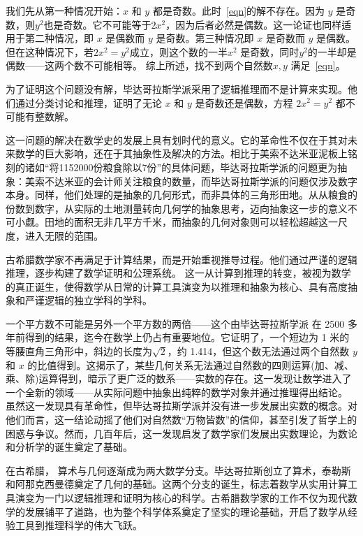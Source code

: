 我们先从第一种情况开始：$x$ 和 $y$ 都是奇数。此时~\eqref{eqn}的解不存在。因为 $y$ 是奇数，则$y^2$也是奇数。它不可能等于$2x^2$，因为后者必然是偶数。这一论证也同样适用于第二种情况，即 $x$ 是偶数而 $y$ 是奇数。第三种情况即 $x$ 是奇数而 $y$ 是偶数。但在这种情况下，若$2x^2=y^2$成立，则这个数的一半$x^2$ 是奇数，同时$y^2$的一半却是偶数——这两个数不可能相等。
综上所述，找不到两个自然数$x,y$ 满足~\eqref{eqn}。

为了证明这个问题没有解，毕达哥拉斯学派采用了逻辑推理而不是计算来实现。他们通过分类讨论和推理，证明了无论 $x$ 和 $y$ 是奇数还是偶数，方程 $2x^2 = y^2$ 都不可能有整数解。


这一问题的解决在数学史的发展上具有划时代的意义。它的革命性不仅在于其对未来数学的巨大影响，还在于其抽象性及解决的方法。相比于美索不达米亚泥板上铭刻的诸如“将1152000份粮食除以7份”的具体问题，毕达哥拉斯学派的问题更为抽象：美索不达米亚的会计师关注粮食的数量，而毕达哥拉斯学派的问题仅涉及数字本身。同样，他们处理的是抽象的几何形式，而非具体的三角形田地。从从粮食的份数到数字，从实际的土地测量转向几何学的抽象思考，迈向抽象这一步的意义不可小觑。田地的面积无非几平方千米，而抽象的几何对象则可以轻松超越这一尺度，进入无限的范围。

古希腊数学家不再满足于计算结果，而是开始重视推导过程。他们通过严谨的逻辑推理，逐步构建了数学证明和公理系统。
这一从计算到推理的转变，被视为数学的真正诞生，使得数学从日常的计算工具演变为以推理和抽象为核心、具有高度抽象和严谨逻辑的独立学科的学科。

一个平方数不可能是另外一个平方数的两倍——这个由毕达哥拉斯学派 在 2500 多年前得到的结果，迄今在数学上仍占有重要地位。它证明了，一个短边为 1 米的等腰直角三角形中，斜边的长度为$\sqrt{2}$，约 1.414，但这个数无法通过两个自然数 $y$ 和 $x$ 的比值得到。这揭示了，某些几何关系无法通过自然数的四则运算(加、减、乘、除)运算得到，暗示了更广泛的数系——实数的存在。这一发现让数学进入了一个全新的领域——从实际问题中抽象出纯粹的数学对象并通过推理得出结论。
虽然这一发现具有革命性，但毕达哥拉斯学派并没有进一步发展出实数的概念。对他们而言，这一结论动摇了他们对自然数“万物皆数”的信仰，甚至引发了哲学上的困惑与争议。然而，几百年后，这一发现启发了数学家们发展出实数理论，为数论和分析学的诞生奠定了基础。

在古希腊，%
算术与几何逐渐成为两大数学分支。毕达哥拉斯创立了算术，泰勒斯和阿那克西曼德奠定了几何的基础。这两个分支的诞生，标志着数学从实用计算工具演变为一门以逻辑推理和证明为核心的科学。古希腊数学家的工作不仅为现代数学的发展铺平了道路，也为整个科学体系奠定了坚实的理论基础，开启了数学从经验工具到推理科学的伟大飞跃。

\newpage

